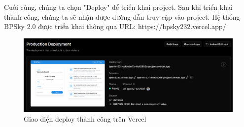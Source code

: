 Cuối cùng, chúng ta chọn "Deploy" để triển khai project. Sau khi triển khai thành công, chúng ta sẽ nhận được đường dẫn truy cập vào project. Hệ thống BPSky 2.0 được triển khai thông qua URL: https://bpsky232.vercel.app/

\begin{figure}[H]
    \centering
    \includegraphics[width=0.7\linewidth]{Content/Hiện thực hệ thống/images/deployVercelSuccessful.png}
    \vspace{0.5cm}
    \caption{Giao diện deploy thành công trên Vercel}
    \label{fig:deploy thành công trên Vercel}
\end{figure}